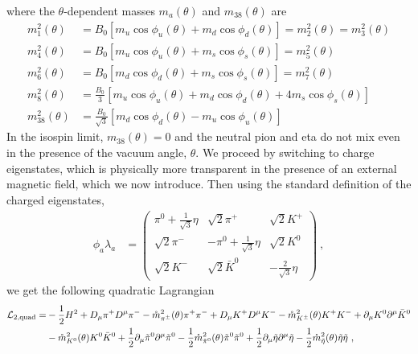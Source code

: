 \documentclass[12pt]{elsarticle}
\begin{document}
where the $\theta$-dependent masses $m_{a}(\theta)$ and $m_{38}(\theta)$ are
\begin{align}
m_{1}^{2}(\theta)&=B_{0}[m_{u}\cos\phi_{u}(\theta)+m_{d}\cos\phi_{d}(\theta)]=m_{2}^{2}(\theta)=m_{3}^{2}(\theta)\\
m_{4}^{2}(\theta)&=B_{0}[m_{u}\cos\phi_{u}(\theta)+m_{s}\cos\phi_{s}(\theta)]=m_{5}^{2}(\theta)\\
m_{6}^{2}(\theta)&=B_{0}[m_{d}\cos\phi_{d}(\theta)+m_{s}\cos\phi_{s}(\theta)]=m_{7}^{2}(\theta)\\
m_{8}^{2}(\theta)&=\frac{B_{0}}{3}[m_{u}\cos\phi_{u}(\theta)+m_{d}\cos\phi_{d}(\theta)+4m_{s}\cos\phi_{s}(\theta)]\\
m_{38}^{2}(\theta)&=\frac{B_{0}}{\sqrt{3}}[m_{d}\cos\phi_{d}(\theta)-m_{u}\cos\phi_{u}(\theta)]
\end{align}
In the isospin limit, $m_{38}(\theta)=0$ and the neutral pion and eta do not mix even in the presence of the vacuum angle, $\theta$. We proceed by switching to charge eigenstates, which is physically more transparent in the presence of an external magnetic field, which we now introduce.  Then using the standard definition of the charged eigenstates,
\begin{equation}
\begin{split}
\phi_{a}\lambda_{a}&=
\begin{pmatrix}
\pi^{0}+\tfrac{1}{\sqrt{3}}\eta&\sqrt{2}\pi^{+}&\sqrt{2}K^{+}\\
\sqrt{2}\pi^{-}&-\pi^{0}+\tfrac{1}{\sqrt{3}}\eta&\sqrt{2}K^{0}\\
\sqrt{2}K^{-}&\sqrt{2}\bar{K}^{0}&-\tfrac{2}{\sqrt{3}}\eta
\end{pmatrix}\ ,
\end{split}
\end{equation}
we get the following quadratic Lagrangian
\begin{align}
\nonumber
\mathcal{L}_{2,\rm quad}=&-\frac{1}{2}H^{2}+D_{\mu}\pi^{+}D^{\mu}\pi^{-}-\mathring{m}_{\pi^{\pm}}^{2}(\theta)\pi^{+}\pi^{-}+D_{\mu}K^{+}D^{\mu}K^{-}-\mathring{m}_{K^{\pm}}^{2}(\theta)K^{+}K^{-}+\partial_{\mu}K^{0}\partial^{\mu}\bar{K}^{0}\\
&-\mathring{m}_{K^{0}}^{2}(\theta)K^{0}\bar{K}^{0}+\frac{1}{2}\partial_{\mu}\tilde{\pi}^{0}\partial^{\mu}\tilde{\pi}^{0}-\frac{1}{2}\mathring{m}_{\tilde{\pi}^{0}}^{2}(\theta)\tilde{\pi}^{0}\tilde{\pi}^{0}+\frac{1}{2}\partial_{\mu}\tilde{\eta}\partial^{\mu}\tilde{\eta}-\frac{1}{2}\mathring{m}_{\tilde{\eta}}^{2}(\theta)\tilde{\eta}\tilde{\eta}\ ,
\end{align}
\end{document}
